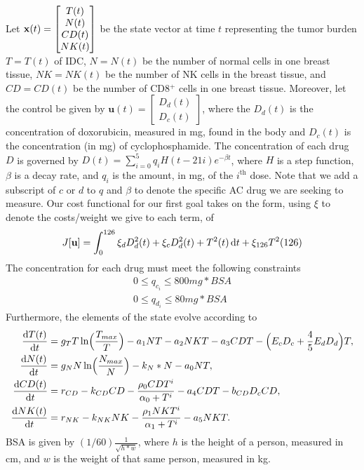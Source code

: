 \documentclass[12pt, oneside]{article}   	%
\begin{document}
Let $\mathbf{x}(t) = \begin{bmatrix} T(t) \\ N(t) \\ CD(t) \\ NK(t)\end{bmatrix}$ be the state vector at time $t$ representing the tumor burden $T=T(t)$ of IDC, $N=N(t)$ be the number of normal cells in one breast tissue, $NK=NK(t)$ be the number of NK cells in the breast tissue, and $CD=CD(t)$ be the number of CD8$^+$ cells in one breast tissue.
Moreover, let the control be given by $\mathbf{u}(t) = \begin{bmatrix} D_d(t) \\ D_c(t) \end{bmatrix}$, where the $D_d(t)$ is the concentration of doxorubicin, measured in mg, found in the body and $D_c(t)$ is the concentration (in mg) of cyclophosphamide.
The concentration of each drug $D$ is governed by $D(t)=\sum_{i=0}^{5}q_iH(t - 21i)e^{-\beta t}$, where $H$ is a step function, $\beta$ is a decay rate, and $q_i$ is the amount, in mg, of the $i^\text{th}$ dose.
Note that we add a subscript of $c$ or $d$ to $q$ and $\beta$ to denote the specific AC drug we are seeking to measure.
Our cost functional for our first goal takes on the form, using $\xi$ to denote the costs/weight we give to each term, of
\begin{align*}
	J[\mathbf{u}] = \int_0^{126} \xi_d D_d^2(t) + \xi_c D_d^2(t) + T^2(t) \mathop{}\!\mathrm{d} t + \xi_{126} T^2(126)
\end{align*}
The concentration for each drug must meet the following constraints
\begin{align*}
	0 \le q_{c_i} \le 800mg*BSA \\
	0 \le q_{d_i} \le 80mg*BSA
\end{align*}
Furthermore, the elements of the state evolve according to 
\begin{align*}
	\frac{\diff T(t)}{\diff t} &= g_T T \ln \Bigl( \frac{T_{max}}{T} \Bigr)- a_1NT - a_2NKT - a_3CDT - \Bigl(E_c D_c +\frac{4}{5}E_d D_d \Bigr)T, \\
	\frac{\diff N(t)}{\diff t} &= g_N N \ln\Bigl(\frac{N_{max}}{N} \Bigr) - k_N * N - a_0NT, \\
	\frac{\diff CD(t)}{\diff t} &= r_{CD} - k_{CD}CD - \frac{\rho_0 CDT ^ i}{\alpha_0 + T^i} - a_4CDT - b_{CD}D_cCD, \\
	\frac{\diff NK(t)}{\diff t} &=r_{NK} - k_{NK}NK - \frac{\rho _1NKT^i}{\alpha_1 + T^i} - a_5NKT. \\
\end{align*}
BSA is given by $(1/60)\frac{1}{\sqrt{h * w}}$, where $h$ is the height of a person, measured in cm, and $w$ is the weight of that same person, measured in kg.
\end{document}
